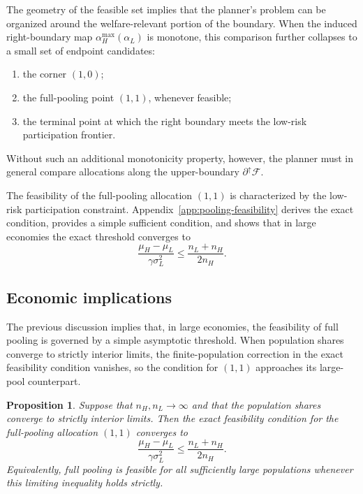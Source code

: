 \documentclass[a4paper,12pt]{article}
\newtheorem{proposition}[theorem]{Proposition}
\theoremstyle{definition}
\theoremstyle{remark}
\newcommand{\1}{\mathbf{1}}
\begin{document}
The geometry of the feasible set implies that the planner's problem can be
organized around the welfare-relevant portion of the boundary. When the induced
right-boundary map \(\alpha_H^{\max}(\alpha_L)\) is monotone, this comparison
further collapses to a small set of endpoint candidates:
\begin{enumerate}[leftmargin=2em]
    \item the corner \((1,0)\);
    \item the full-pooling point \((1,1)\), whenever feasible;
    \item the terminal point at which the right boundary meets the low-risk
    participation frontier.
\end{enumerate}

Without such an
additional monotonicity property, however, the planner must in general compare
allocations along the upper-boundary $\partial^\uparrow\mathcal F$.

The feasibility of the full-pooling allocation \((1,1)\) is characterized by
the low-risk participation constraint. Appendix~\ref{app:pooling-feasibility}
derives the exact condition, provides a simple sufficient condition, and shows
that in large economies the exact threshold converges to
\[
    \frac{\mu_H - \mu_L}{\gamma \sigma_L^2}
    \le
    \frac{n_L + n_H}{2 n_H}.
\]




\subsection{Economic implications}

The previous discussion implies that, in large economies, the feasibility of
full pooling is governed by a simple asymptotic threshold. When population
shares converge to strictly interior limits, the finite-population correction
in the exact feasibility condition vanishes, so the condition for \((1,1)\)
approaches its large-pool counterpart.

\begin{proposition}
Suppose that \(n_H,n_L \to \infty\) and that the population shares converge to
strictly interior limits. Then the exact feasibility condition for the
full-pooling allocation \((1,1)\) converges to
\[
    \frac{\mu_H-\mu_L}{\gamma\sigma_L^2}
    \le
    \frac{n_L+n_H}{2n_H}.
\]
Equivalently, full pooling is feasible for all sufficiently large populations
whenever this limiting inequality holds strictly.
\end{proposition}
\end{document}
